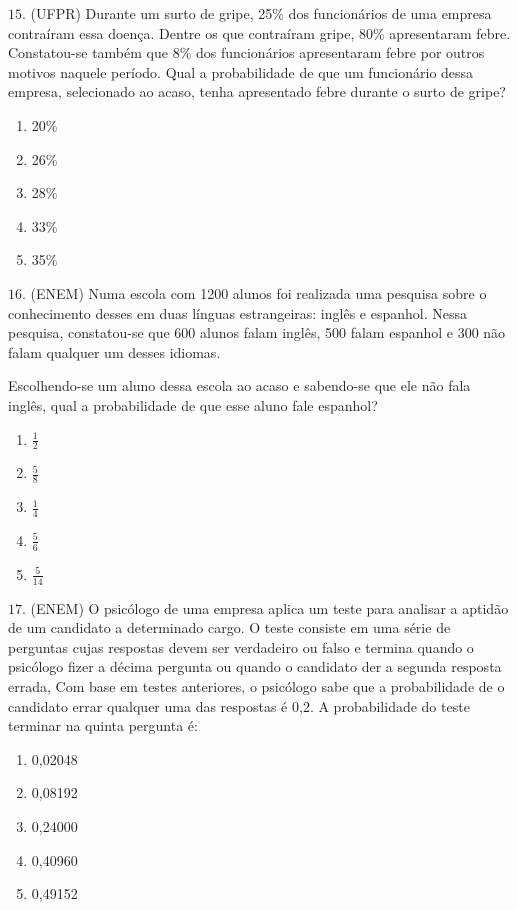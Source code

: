 \(15.\) (UFPR) Durante um surto de gripe, 25\% dos funcionários de uma empresa contraíram essa doença. Dentre os que contraíram gripe, 80\% apresentaram febre. Constatou-se também que 8\% dos funcionários apresentaram febre por outros motivos naquele período. Qual a probabilidade de que um funcionário dessa empresa, selecionado ao acaso, tenha apresentado febre durante o surto de gripe?
\begin{enumerate}
\item {} 
20\%

\item {} 
26\%

\item {} 
28\%

\item {} 
33\%

\item {} 
35\%

\end{enumerate}

\(16.\) (ENEM) Numa escola com 1200 alunos foi realizada uma pesquisa sobre o conhecimento desses em duas línguas estrangeiras: inglês e espanhol. Nessa pesquisa, constatou-se que 600 alunos falam inglês, 500 falam espanhol e 300 não falam qualquer um desses idiomas.

Escolhendo-se um aluno dessa escola ao acaso e sabendo-se que ele não fala inglês, qual a probabilidade de que esse aluno fale espanhol?
\begin{enumerate}
\item {} 
\(\frac{1}{2}\)

\item {} 
\(\frac{5}{8}\)

\item {} 
\(\frac{1}{4}\)

\item {} 
\(\frac{ 5}{6}\)

\item {} 
\(\frac{5}{14}\)

\end{enumerate}

\(17.\) (ENEM) O psicólogo de uma empresa aplica um teste para analisar a aptidão de um candidato a determinado cargo. O teste consiste em uma série de perguntas cujas respostas devem ser verdadeiro ou falso e termina quando o psicólogo fizer a décima pergunta ou quando o candidato der a segunda resposta errada, Com base em testes anteriores, o psicólogo sabe que a probabilidade de o candidato errar qualquer uma das respostas é 0,2. A probabilidade do teste terminar na quinta pergunta é:
\begin{enumerate}
\item {} 
0,02048

\item {} 
0,08192

\item {} 
0,24000

\item {} 
0,40960

\item {} 
0,49152

\end{enumerate}

